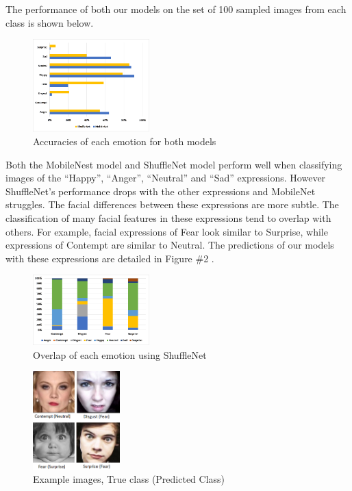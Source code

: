 \documentclass[10pt,twocolumn,letterpaper]{article}
\begin{document}
The performance of both our models on the  set of 100  sampled images from each class is shown below.

\begin{figure}[ht]
\caption{Accuracies of each emotion for both models}
\centering
\includegraphics[width=0.4\textwidth]{SegregatedAcc}
\end{figure}

Both the MobileNest model and ShuffleNet model perform well when classifying images of the “Happy”, “Anger”, “Neutral” and “Sad” expressions. However ShuffleNet’s performance drops with the other expressions and MobileNet struggles.
The facial differences between these expressions are more subtle. The classification of many facial features in these expressions tend to overlap with others. For example, facial expressions of Fear look similar to Surprise, while expressions of Contempt are similar to Neutral. The predictions of our models with these expressions are detailed in Figure \#2 .

\begin{figure}[ht]
\caption{Overlap of each emotion using ShuffleNet}
\centering
\includegraphics[width=0.4\textwidth]{Predicted}
\end{figure}

\begin{figure}[ht]
\caption{Example images, True class (Predicted Class)}
\centering
\includegraphics[width=0.3\textwidth]{emotions}
\end{figure}
\end{document}
